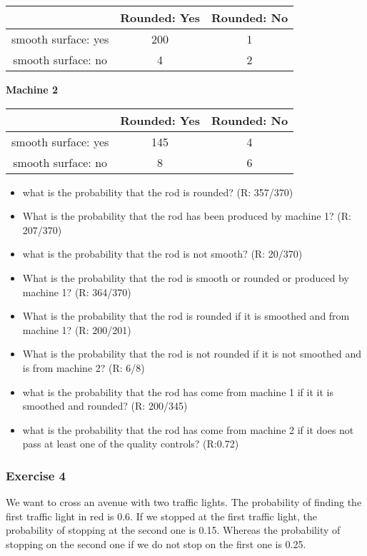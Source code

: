 \documentclass[
]{book}
\providecommand{\tightlist}{%
  \setlength{\itemsep}{0pt}\setlength{\parskip}{0pt}}
\begin{document}
\begin{longtable}[]{@{}ccc@{}}
\toprule
& Rounded: Yes & Rounded: No \\
\midrule
\endhead
smooth surface: yes & 200 & 1 \\
smooth surface: no & 4 & 2 \\
\bottomrule
\end{longtable}

\textbf{Machine 2}

\begin{longtable}[]{@{}ccc@{}}
\toprule
& Rounded: Yes & Rounded: No \\
\midrule
\endhead
smooth surface: yes & 145 & 4 \\
smooth surface: no & 8 & 6 \\
\bottomrule
\end{longtable}

\begin{itemize}
\tightlist
\item
  what is the probability that the rod is rounded? (R: 357/370)
\item
  What is the probability that the rod has been produced by machine 1? (R: 207/370)
\item
  what is the probability that the rod is not smooth? (R: 20/370)
\item
  What is the probability that the rod is smooth or rounded or produced by machine 1? (R: 364/370)
\item
  What is the probability that the rod is rounded if it is smoothed and from machine 1? (R: 200/201)
\item
  What is the probability that the rod is not rounded if it is not smoothed and is from machine 2? (R: 6/8)
\item
  what is the probability that the rod has come from machine 1 if it it is smoothed and rounded? (R: 200/345)
\item
  what is the probability that the rod has come from machine 2 if it does not pass at least one of the quality controls? (R:0.72)
\end{itemize}

\hypertarget{exercise-4}{%
\subsubsection{Exercise 4}\label{exercise-4}}

We want to cross an avenue with two traffic lights. The probability of finding the first traffic light in red is 0.6. If we stopped at the first traffic light, the probability of stopping at the second one is 0.15. Whereas the probability of stopping on the second one if we do not stop on the first one is 0.25.
\end{document}

